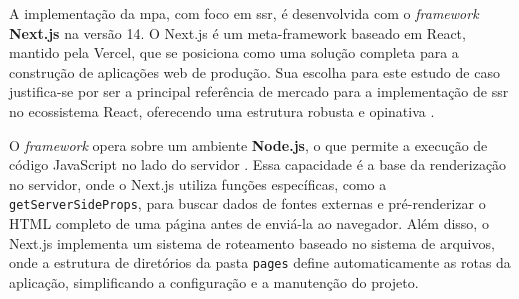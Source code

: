 A implementação da \acrfull{mpa}, com foco em \acrfull{ssr}, é desenvolvida com o \emph{framework} \textbf{Next.js} na versão 14. O Next.js é um meta-framework baseado em React, mantido pela Vercel, que se posiciona como uma solução completa para a construção de aplicações web de produção. Sua escolha para este estudo de caso justifica-se por ser a principal referência de mercado para a implementação de \acrshort{ssr} no ecossistema React, oferecendo uma estrutura robusta e opinativa \cite{nextjs2024}.

O \emph{framework} opera sobre um ambiente \textbf{Node.js}, o que permite a execução de código JavaScript no lado do servidor \cite{nodejs2025}. Essa capacidade é a base da renderização no servidor, onde o Next.js utiliza funções específicas, como a \texttt{getServerSideProps}, para buscar dados de fontes externas e pré-renderizar o HTML completo de uma página antes de enviá-la ao navegador. Além disso, o Next.js implementa um sistema de roteamento baseado no sistema de arquivos, onde a estrutura de diretórios da pasta \texttt{pages} define automaticamente as rotas da aplicação, simplificando a configuração e a manutenção do projeto.